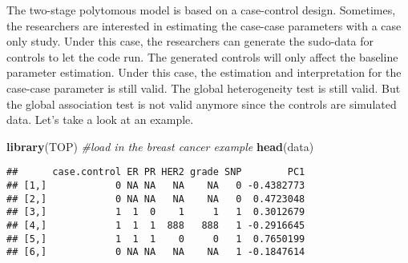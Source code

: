 \documentclass[11pt,]{article}
\newenvironment{Shaded}{\begin{snugshade}}{\end{snugshade}}
\newcommand{\CommentTok}[1]{\textcolor[rgb]{0.56,0.35,0.01}{\textit{#1}}}
\newcommand{\KeywordTok}[1]{\textcolor[rgb]{0.13,0.29,0.53}{\textbf{#1}}}
\newcommand{\NormalTok}[1]{#1}
\begin{document}
The two-stage polytomous model is based on a case-control design.
Sometimes, the researchers are interested in estimating the case-case
parameters with a case only study. Under this case, the researchers can
generate the sudo-data for controls to let the code run. The generated
controls will only affect the baseline parameter estimation. Under this
case, the estimation and interpretation for the case-case parameter is
still valid. The global heterogeneity test is still valid. But the
global association test is not valid anymore since the controls are
simulated data. Let's take a look at an example.

\begin{Shaded}
\begin{Highlighting}[]
\KeywordTok{library}\NormalTok{(TOP)}
\CommentTok{#load in the breast cancer example}
\KeywordTok{head}\NormalTok{(data)}
\end{Highlighting}
\end{Shaded}

\begin{verbatim}
##      case.control ER PR HER2 grade SNP        PC1
## [1,]            0 NA NA   NA    NA   0 -0.4382773
## [2,]            0 NA NA   NA    NA   0  0.4723048
## [3,]            1  1  0    1     1   1  0.3012679
## [4,]            1  1  1  888   888   1 -0.2916645
## [5,]            1  1  1    0     0   1  0.7650199
## [6,]            0 NA NA   NA    NA   1 -0.1847614
\end{verbatim}
\end{document}
